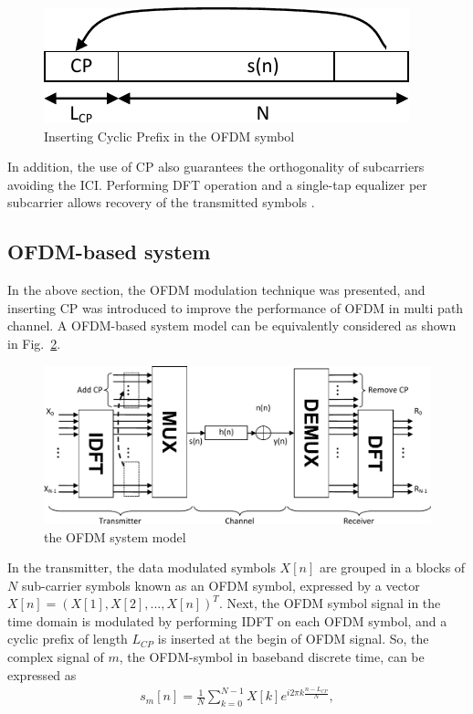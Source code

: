 \begin{figure}
	\centerline{\includegraphics [width=0.8\columnwidth] {Figures/CP.pdf} }
	\caption{Inserting Cyclic Prefix in the OFDM symbol}
	\label{fig:CP}
\end{figure}

In addition, the use of CP also guarantees the orthogonality of subcarriers avoiding the ICI. Performing DFT operation and a single-tap equalizer per subcarrier allows recovery of the transmitted symbols \cite{farhang2008signal}. 

\subsection{OFDM-based system}
In the above section, the OFDM modulation technique was presented, and inserting CP was introduced to improve the performance of OFDM in multi path channel. 
A OFDM-based system model can be equivalently considered as shown in Fig.~\ref{fig:OFDM-model}.

\begin{figure}
	\centerline{\includegraphics [width=0.8\columnwidth] {Figures/OFDM-model.pdf} }
	\caption{the OFDM system model}
	\label{fig:OFDM-model}
\end{figure}

In the transmitter, the data modulated symbols $X[n]$ are grouped in a blocks of $N$ sub-carrier symbols known as an OFDM symbol, expressed by a vector $X[n]=(X[1], X[2], ..., X[n])^T$. 
Next, the OFDM symbol signal in the time domain is modulated by performing IDFT on each OFDM symbol, and a cyclic prefix of length $L_{CP}$ is inserted at the begin of OFDM signal. 
So, the complex signal of $m$, the OFDM-symbol in baseband discrete time, can be expressed as
\begin{eqnarray}
\label{equ:OFDMsymbol}
s_{m}[n] = \frac{1}{N} \sum_{k=0}^{N-1}X[k]e^{i2\pi k\frac{n-L_{CP}}{N}},
\end{eqnarray} 

